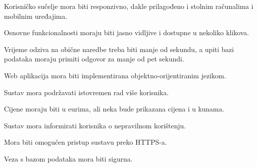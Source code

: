 			 \begin{packed_item}
			 
			 \item Korisničko sučelje mora biti responzivno, dakle prilagođeno i stolnim računalima i mobilnim uređajima.
			 
			 \item Osnovne funkcionalnosti moraju biti jasno vidljive i dostupne u nekoliko klikova.
			 
			 \item Vrijeme odziva na obične naredbe treba biti manje od sekundu, a upiti bazi podataka moraju primiti odgovor za manje od pet sekundi.
			 
			 \item Web aplikacija mora biti implementirana objektno-orijentiranim jezikom.
			 
			 \item Sustav mora podržavati istovremen rad više korisnika.
			 
			 \item Cijene moraju biti u eurima, ali neka bude prikazana cijena i u kunama.
			 
			 \item Sustav mora informirati korisnika o nepravilnom korištenju.
			 
			 \item Mora biti omogućen pristup sustavu preko HTTPS-a.
			 
			 \item Veza s bazom podataka mora biti sigurna.
			 
			 	
			 \end{packed_item}
			 
			 
			
			 
			 